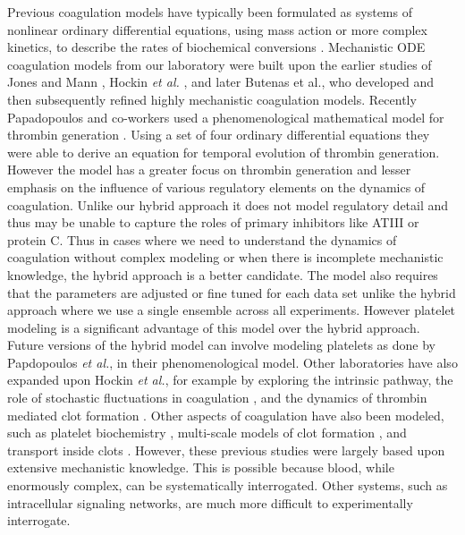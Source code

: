 \documentclass[processes,article,received,moreauthors,pdftex,12pt,a4paper]{mdpi}
\begin{document}
Previous coagulation models have typically been formulated as systems of nonlinear ordinary differential equations, 
using mass action or more complex kinetics, to describe the rates of biochemical conversions \citep{Khanin:1989aa,Willems:1991aa,Baldwin:1994aa,Leipold:1995aa,Kuharsky:2001aa}.
Mechanistic ODE coagulation models from our laboratory \citep{Luan:2007aa,2010_luan_varner_MolBioSys} 
were built upon the earlier studies of Jones and Mann \citep{Jones:1994aa}, Hockin \emph{et al.} \citep{Hockin:2002aa}, and later Butenas et al., \citep{Butenas:2004aa}
who developed and then subsequently refined highly mechanistic coagulation models. Recently Papadopoulos and co-workers used a phenomenological  mathematical model for thrombin generation \cite{Atkin:2014}. Using a set of four ordinary differential equations they were able to derive an equation for temporal evolution of thrombin generation. However the model has a greater focus on thrombin generation and lesser emphasis on the influence of various regulatory elements on the dynamics of coagulation. Unlike our hybrid approach it does not model regulatory detail and thus may be unable to capture the roles of primary inhibitors like ATIII or protein C. Thus in cases where we need to understand the dynamics of coagulation without complex modeling or when there is incomplete mechanistic knowledge, the hybrid approach is a better candidate. The model also requires that the parameters are adjusted or fine tuned for each data set unlike the hybrid approach where we use a single ensemble across all experiments. However platelet modeling is a significant advantage of this model over the hybrid approach.  Future versions of the hybrid model can involve modeling platelets as done by Papdopoulos \emph{et al.}, in their phenomenological model. Other laboratories have also expanded upon Hockin \emph{et al.}, for example by exploring the intrinsic pathway, the role of stochastic fluctuations in coagulation \citep{Lo:2005aa}, and the dynamics of thrombin mediated clot formation \citep{Chatterjee:2010aa}. 
Other aspects of coagulation have also been modeled, such as platelet biochemistry \citep{Stalker:2013aa}, 
multi-scale models of clot formation \citep{Leiderman:2014aa, Bannish:2014ab}, and transport inside clots \citep{Voronov:2013aa}.
However, these previous studies were largely based upon extensive mechanistic knowledge. 
This is possible because blood, while enormously complex, can be systematically interrogated.
Other systems, such as intracellular signaling networks, are much more difficult to experimentally interrogate.  
\end{document}
